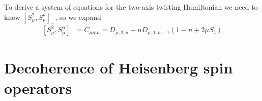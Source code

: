 \documentclass[aps,notitlepage,nofootinbib,11pt]{revtex4-1}
\newcommand{\p}[1]{\left(#1\right)} %
\renewcommand{\sp}[1]{\left[#1\right]} %
\renewcommand{\set}[1]{\left\{#1\right\}} %
\newcommand{\C}{\mathcal{C}}
\renewcommand{\S}{\mathcal{S}}
\newcommand{\Z}{\mathbb{Z}}
\newcommand{\bmu}{{\bar\mu}}
\newcommand{\1}{\mathds{1}}
\begin{document}




\vspace{3cm}

To derive a system of equations for the two-axis twisting Hamiltonian
we need to know $\sp{S_\mu^2,S_\bmu^n}_-$, so we expand
\begin{align}
  \sp{S_\mu^2,S_\bmu^n}_-
  = C_{\mu mn}
  = D_{\mu,2,n} + n D_{\mu,1,n-1} \p{1 - n + 2\mu S_z}
\end{align}


\newpage

\section{Decoherence of Heisenberg spin operators}
\label{sec:decoherence}
\end{document}

